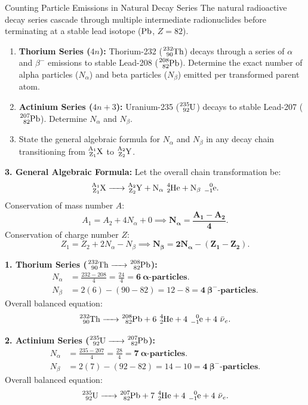 \begin{exercise}{Counting Particle Emissions in Natural Decay Series}
The natural radioactive decay series cascade through multiple intermediate radionuclides before terminating at a stable lead isotope ($\ce{Pb}$, $Z = 82$).
\begin{enumerate}[leftmargin=1.5em,itemsep=2pt]
  \item \textbf{Thorium Series ($4n$):} Thorium-232 ($\ce{^{232}_{90}Th}$) decays through a series of $\alpha$ and $\beta^-$ emissions to stable Lead-208 ($\ce{^{208}_{82}Pb}$).
  Determine the exact number of alpha particles ($N_\alpha$) and beta particles ($N_\beta$) emitted per transformed parent atom.
  \item \textbf{Actinium Series ($4n+3$):} Uranium-235 ($\ce{^{235}_{92}U}$) decays to stable Lead-207 ($\ce{^{207}_{82}Pb}$).
  Determine $N_\alpha$ and $N_\beta$.
  \item State the general algebraic formula for $N_\alpha$ and $N_\beta$ in any decay chain transitioning from $\ce{^{A_1}_{Z_1}X}$ to $\ce{^{A_2}_{Z_2}Y}$.
\end{enumerate}
\end{exercise}

\begin{tabletworkspace}[5.0cm]
\end{tabletworkspace}

\begin{solution}
\textbf{3. General Algebraic Formula:}
Let the overall chain transformation be:
\[
\ce{^{A_1}_{Z_1}X -> ^{A_2}_{Z_2}Y + N_\alpha \, ^{4}_{2}He + N_\beta \, ^{0}_{-1}e}.
\]
Conservation of mass number $A$:
\[
A_1 = A_2 + 4 N_\alpha + 0 \implies \mathbf{N_\alpha = \frac{A_1 - A_2}{4}}.
\]
Conservation of charge number $Z$:
\[
Z_1 = Z_2 + 2 N_\alpha - N_\beta \implies \mathbf{N_\beta = 2 N_\alpha - (Z_1 - Z_2)}.
\]

\textbf{1. Thorium Series ($\ce{^{232}_{90}Th -> ^{208}_{82}Pb}$):}
\begin{align*}
N_\alpha &= \frac{232 - 208}{4} = \frac{24}{4} = \mathbf{6\ \alpha\text{-particles}}. \\
N_\beta &= 2(6) - (90 - 82) = 12 - 8 = \mathbf{4\ \beta^-\text{-particles}}.
\end{align*}
Overall balanced equation:
\[
\ce{^{232}_{90}Th -> ^{208}_{82}Pb + 6\,^{4}_{2}He + 4\,^{0}_{-1}e + 4\,\bar{\nu}_e}.
\]

\textbf{2. Actinium Series ($\ce{^{235}_{92}U -> ^{207}_{82}Pb}$):}
\begin{align*}
N_\alpha &= \frac{235 - 207}{4} = \frac{28}{4} = \mathbf{7\ \alpha\text{-particles}}. \\
N_\beta &= 2(7) - (92 - 82) = 14 - 10 = \mathbf{4\ \beta^-\text{-particles}}.
\end{align*}
Overall balanced equation:
\[
\ce{^{235}_{92}U -> ^{207}_{82}Pb + 7\,^{4}_{2}He + 4\,^{0}_{-1}e + 4\,\bar{\nu}_e}.
\]
\end{solution}


